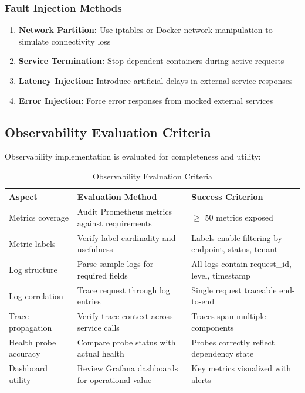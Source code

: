 \documentclass[a4paper,twoside]{sapthesis}
\begin{document}
\subsubsection{Fault Injection Methods}

\begin{enumerate}
    \item \textbf{Network Partition:} Use iptables or Docker network manipulation to simulate connectivity loss
    \item \textbf{Service Termination:} Stop dependent containers during active requests
    \item \textbf{Latency Injection:} Introduce artificial delays in external service responses
    \item \textbf{Error Injection:} Force error responses from mocked external services
\end{enumerate}

\subsection{Observability Evaluation Criteria}
\label{subsec:observability-criteria}

Observability implementation is evaluated for completeness and utility:

\begin{table}[htbp]
\centering
\caption{Observability Evaluation Criteria}
\label{tab:observability-eval}
\small
\begin{tabularx}{\textwidth}{p{2.5cm}Xp{4.5cm}}
\toprule
\textbf{Aspect} & \textbf{Evaluation Method} & \textbf{Success Criterion} \\
\midrule
Metrics coverage & Audit Prometheus metrics against requirements & $\geq$ 50 metrics exposed \\
\midrule
Metric labels & Verify label cardinality and usefulness & Labels enable filtering by endpoint, status, tenant \\
\midrule
Log structure & Parse sample logs for required fields & All logs contain request\_id, level, timestamp \\
\midrule
Log correlation & Trace request through log entries & Single request traceable end-to-end \\
\midrule
Trace propagation & Verify trace context across service calls & Traces span multiple components \\
\midrule
Health probe accuracy & Compare probe status with actual health & Probes correctly reflect dependency state \\
\midrule
Dashboard utility & Review Grafana dashboards for operational value & Key metrics visualized with alerts \\
\bottomrule
\end{tabularx}
\end{table}
\end{document}
